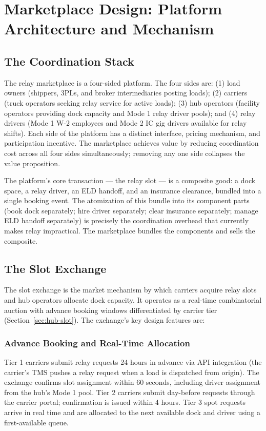 \section{Marketplace Design: Platform Architecture and Mechanism}
\label{sec:marketplace}

\subsection{The Coordination Stack}

The relay marketplace is a four-sided platform. The four sides are: (1) load owners (shippers, 3PLs, and broker intermediaries posting loads); (2) carriers (truck operators seeking relay service for active loads); (3) hub operators (facility operators providing dock capacity and Mode 1 relay driver pools); and (4) relay drivers (Mode 1 W-2 employees and Mode 2 IC gig drivers available for relay shifts). Each side of the platform has a distinct interface, pricing mechanism, and participation incentive. The marketplace achieves value by reducing coordination cost across all four sides simultaneously; removing any one side collapses the value proposition.

The platform's core transaction --- the relay slot --- is a composite good: a dock space, a relay driver, an ELD handoff, and an insurance clearance, bundled into a single booking event. The atomization of this bundle into its component parts (book dock separately; hire driver separately; clear insurance separately; manage ELD handoff separately) is precisely the coordination overhead that currently makes relay impractical. The marketplace bundles the components and sells the composite.

\subsection{The Slot Exchange}

The slot exchange is the market mechanism by which carriers acquire relay slots and hub operators allocate dock capacity. It operates as a real-time combinatorial auction with advance booking windows differentiated by carrier tier (Section~\ref{sec:hub-slot}). The exchange's key design features are:

\subsubsection*{Advance Booking and Real-Time Allocation}

Tier 1 carriers submit relay requests 24 hours in advance via API integration (the carrier's TMS pushes a relay request when a load is dispatched from origin). The exchange confirms slot assignment within 60 seconds, including driver assignment from the hub's Mode 1 pool. Tier 2 carriers submit day-before requests through the carrier portal; confirmation is issued within 4 hours. Tier 3 spot requests arrive in real time and are allocated to the next available dock and driver using a first-available queue.

